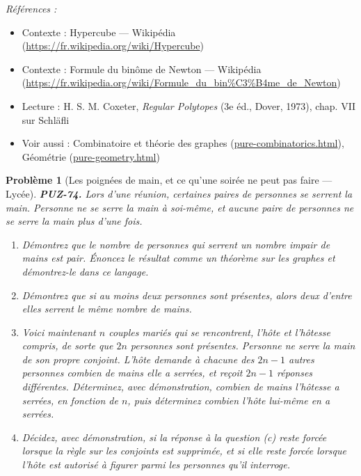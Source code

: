 \documentclass[11pt]{article}
\newtheorem{problem}{Problème}
\newenvironment{refs}{\par\small\noindent\emph{Références :}\begin{itemize}\setlength\itemsep{0pt}}{\end{itemize}\normalsize}
\begin{document}
\begin{refs}
\item Contexte : Hypercube --- Wikipédia (\url{https://fr.wikipedia.org/wiki/Hypercube})
\item Contexte : Formule du binôme de Newton --- Wikipédia (\url{https://fr.wikipedia.org/wiki/Formule_du_bin%C3%B4me_de_Newton})
\item Lecture : H. S. M. Coxeter, \textit{Regular Polytopes} (3e éd., Dover, 1973), chap. VII sur Schläfli
\item Voir aussi : Combinatoire et théorie des graphes (\url{pure-combinatorics.html}), Géométrie (\url{pure-geometry.html})
\end{refs}

\bigskip

\begin{problem}[{Les poignées de main, et ce qu'une soirée ne peut pas faire --- Lycée}]
\textbf{PUZ-74.} Lors d'une réunion, certaines paires de personnes se serrent la main.
Personne ne se serre la main à soi-même, et aucune paire de personnes ne se serre la main
plus d'une fois.
\begin{enumerate}
\item[(a)] Démontrez que le nombre de personnes qui serrent un nombre impair de mains est pair.
Énoncez le résultat comme un théorème sur les graphes et démontrez-le dans ce langage.
\item[(b)] Démontrez que si au moins deux personnes sont présentes, alors deux d'entre elles
serrent le même nombre de mains.
\item[(c)] Voici maintenant $ n $ couples mariés qui se rencontrent, l'hôte et l'hôtesse compris,
de sorte que $ 2n $ personnes sont présentes. Personne ne serre la main de son propre
conjoint. L'hôte demande à chacune des $ 2n-1 $ autres personnes combien de mains elle a
serrées, et reçoit $ 2n-1 $ réponses différentes. Déterminez, avec démonstration, combien
de mains l'hôtesse a serrées, en fonction de $ n $, puis déterminez combien l'hôte
lui-même en a serrées.
\item[(d)] Décidez, avec démonstration, si la réponse à la question (c) reste forcée lorsque la
règle sur les conjoints est supprimée, et si elle reste forcée lorsque l'hôte est autorisé à
figurer parmi les personnes qu'il interroge.
\end{enumerate}

\end{problem}
\end{document}

